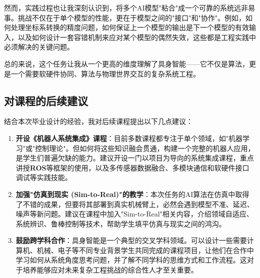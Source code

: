 \documentclass{article}
\begin{document}
\begin{CJK*}{UTF8}{gbsn}
然而，实践过程也让我深刻认识到，将多个AI模型"粘合"成一个可靠的系统远非易事。挑战不仅在于单个模型的性能，更在于模型之间的"接口"和"协作"。例如，如何处理坐标系转换的精度问题，如何保证上一个模型的输出是下一个模型的有效输入，以及如何设计一套容错机制来应对某个模型的偶然失效，这些都是工程实践中必须解决的关键问题。

总的来说，这个任务让我从一个更高的维度理解了具身智能——它不仅是算法，更是一个需要软硬件协同、算法与物理世界交互的复杂系统工程。

\subsection{对课程的后续建议}

结合本次毕业设计的经验，我对后续课程提出以下几点建议：

\begin{enumerate}
    \item  \textbf{开设《机器人系统集成》课程}：目前多数课程都专注于单个领域，如"机器学习"或"控制理论"。但如何将这些知识融会贯通，构建一个完整的机器人应用，是学生们普遍欠缺的能力。建议开设一门以项目为导向的系统集成课程，重点讲授\textbf{ROS}等框架的使用，以及多传感器数据融合、多模块通信和软硬件接口调试等实践技能。
    \item  \textbf{加强"仿真到现实 (Sim-to-Real)"的教学}：本次任务的AI算法在仿真中取得了不错的成果，但要将其部署到真实机械臂上，必然会遇到模型不准、延迟、噪声等新问题。建议在课程中加入"Sim-to-Real"相关内容，介绍领域自适应、系统辨识、鲁棒控制等技术，帮助学生填平仿真与现实之间的鸿沟。
    \item  \textbf{鼓励跨学科合作}：具身智能是一个典型的交叉学科领域。可以设计一些需要计算机、机械、电子等不同专业背景学生共同完成的课程项目，让他们在合作中学习如何从系统角度思考问题，并了解不同学科的思维方式和工作流程。这对于培养能够应对未来复杂工程挑战的综合性人才至关重要。 
\end{enumerate}

\end{CJK*}
\end{document}
